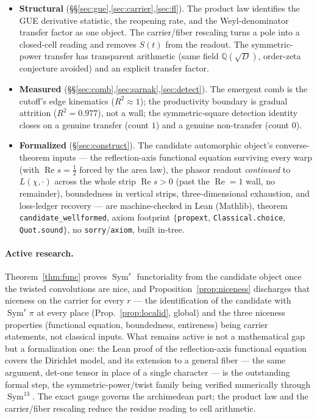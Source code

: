 \documentclass[11pt]{article}
\theoremstyle{definition}
\renewcommand{\Re}{\operatorname{Re}}
\newcommand{\Sym}{\operatorname{Sym}}
\begin{document}
\begin{itemize}
\item \textbf{Structural} (\S\S\ref{sec:gue},\ref{sec:carrier},\ref{sec:fl}). The product law
identifies the GUE derivative statistic, the reopening rate, and the Weyl-denominator transfer factor
as one object. The carrier/fiber rescaling turns a pole into a closed-cell reading and removes $S(t)$
from the readout. The symmetric-power transfer has transparent arithmetic (same field
$\mathbb Q(\sqrt D)$, order-zeta conjecture avoided) and an explicit transfer factor.

\item \textbf{Measured} (\S\S\ref{sec:comb},\ref{sec:sarnak},\ref{sec:detect}). The emergent comb is
the cutoff's edge kinematics ($R^2\approx1$); the productivity boundary is gradual attrition
($R^2=0.977$), not a wall; the symmetric-square detection identity closes on a genuine transfer
(count $1$) and a genuine non-transfer (count $0$).

\item \textbf{Formalized} (\S\ref{sec:construct}). The candidate automorphic object's converse-theorem
inputs --- the reflection-axis functional equation surviving every warp (with $\Re s=\tfrac12$ forced
by the area law), the phasor readout \emph{continued} to $L(\chi,\cdot)$ across the whole strip
$\Re s>0$ (past the $\Re=1$ wall, no remainder), boundedness in vertical strips, three-dimensional
exhaustion, and loss-ledger recovery --- are machine-checked in Lean (Mathlib), theorem
\texttt{candidate\_wellformed}, axiom footprint $\{$\texttt{propext}, \texttt{Classical.choice},
\texttt{Quot.sound}$\}$, no \texttt{sorry}/\texttt{axiom}, built in-tree.
\end{itemize}

\paragraph{Active research.} Theorem~\ref{thm:func} proves $\Sym^r$ functoriality from the candidate
object once the twisted convolutions are nice, and Proposition~\ref{prop:niceness} discharges that
niceness on the carrier for every $r$ --- the identification of the candidate with $\Sym^r\pi$ at every
place (Prop.~\ref{prop:localid}, global) and the three niceness properties (functional equation,
boundedness, entireness) being carrier statements, not classical inputs. What remains active is not a
mathematical gap but a formalization one: the Lean proof of the reflection-axis functional equation
covers the Dirichlet model, and its extension to a general fiber --- the same argument, det-one tensor
in place of a single character --- is the outstanding formal step, the symmetric-power/twist family
being verified numerically through $\Sym^{13}$. The exact gauge governs the archimedean part; the
product law and the carrier/fiber rescaling reduce the residue reading to cell arithmetic.
\end{document}

